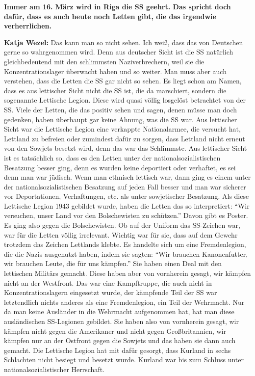\textbf{Immer am 16. März wird in Riga die SS geehrt. Das spricht doch dafür, dass es auch heute noch Letten gibt, die das irgendwie verherrlichen.} 

\textbf{Katja Wezel:} Das kann man so nicht sehen. Ich weiß, dass das von Deutschen gerne so wahrgenommen wird. Denn aus deutscher Sicht ist die SS natürlich gleichbedeutend mit den schlimmsten Naziverbrechern, weil sie die Konzentrationslager überwacht haben und so weiter. Man muss aber auch verstehen, dass die Letten die SS gar nicht so sehen. Es liegt schon am Namen, dass es aus lettischer Sicht nicht die SS ist, die da marschiert, sondern die sogenannte Lettische Legion. Diese wird quasi völlig losgelöst betrachtet von der SS. Viele der Letten, die das positiv sehen und sagen, denen müsse man doch gedenken, haben überhaupt gar keine Ahnung, was die SS war. Aus lettischer Sicht war die Lettische Legion eine verkappte Nationalarmee, die versucht hat, Lettland zu befreien oder zumindest dafür zu sorgen, dass Lettland nicht erneut von den Sowjets besetzt wird, denn das war das Schlimmste. Aus lettischer Sicht ist es tatsächlich so, dass es den Letten unter der nationalsozialistischen Besatzung besser ging, denn es wurden keine deportiert oder verhaftet, es sei denn man war jüdisch. Wenn man ethnisch lettisch war, dann ging es einem unter der nationalsozialistischen Besatzung auf jeden Fall besser und man war sicherer vor Deportationen, Verhaftungen, etc. als unter sowjetischer Besatzung. Als diese Lettische Legion 1943 gebildet wurde, haben die Letten das so interpretiert: ``Wir versuchen, unser Land vor den Bolschewisten zu schützen.'' Davon gibt es Poster. Es ging also gegen die Bolschewisten. Ob auf der Uniform das SS-Zeichen war, war für die Letten völlig irrelevant. Wichtig war für sie, dass auf dem Gewehr trotzdem das Zeichen Lettlands klebte. Es handelte sich um eine Fremdenlegion, die die Nazis ausgenutzt haben, indem sie sagten: ``Wir brauchen Kanonenfutter, wir brauchen Leute, die für uns kämpfen.'' Sie haben einen Deal mit den lettischen Militärs gemacht. Diese haben aber von vornherein gesagt, wir kämpfen nicht an der Westfront. Das war eine Kampftruppe, die auch nicht in Konzentrationslagern eingesetzt wurde, der kämpfende Teil der SS war letztendlich nichts anderes als eine Fremdenlegion, ein Teil der Wehrmacht. Nur da man keine Ausländer in die Wehrmacht aufgenommen hat, hat man diese ausländischen SS-Legionen gebildet. Sie haben also von vornherein gesagt, wir kämpfen nicht gegen die Amerikaner und nicht gegen Großbritannien, wir kämpfen nur an der Ostfront gegen die Sowjets und das haben sie dann auch gemacht. Die Lettische Legion hat mit dafür gesorgt, dass Kurland in sechs Schlachten nicht besiegt und besetzt wurde. Kurland war bis zum Schluss unter nationalsozialistischer Herrschaft. 
